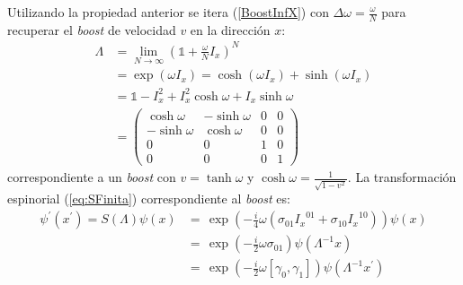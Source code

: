 \begin{example}
\begin{equation}
	\end{equation}
	Utilizando la propiedad anterior se itera (\ref{BoostInfX}) con $\Delta \omega=\frac{\omega}{N}$ para recuperar el \textit{boost} de velocidad $v$ en la dirección $x$:
	\begin{align*}
	\Lambda &= \lim_{N\rightarrow \infty}\left( \mathbb{1}+\frac{\omega}{N}I_x\right)^N\\
	&= \exp{\left(\omega I_x\right)} =\cosh{\left( \omega I_x\right)}+\sinh{\left( \omega I_x\right)}\\
	&=\mathbb{1}- I_x^2+I_x^2 \cosh{\omega}+I_x \sinh{\omega}\\	
	&=\begin{pmatrix}
    \cosh{\omega} & -\sinh{\omega} & 0 & 0 \\
    -\sinh{\omega} & \cosh{\omega} & 0 & 0 \\
    0 & 0 & 1 & 0 \\
    0 & 0 & 0 & 1
	\end{pmatrix}
	\end{align*}
	correspondiente a un \textit{boost} con $v=\tanh{\omega}$ y $\cosh{\omega}=\frac{1}{\sqrt{1-v^2}}$. La transformación espinorial (\ref{eq:SFinita}) correspondiente al \textit{boost} es:
	\begin{equation}\label{BoostEspinorial}
\begin{aligned}
\psi^{\prime}(x^{\prime})=S(\Lambda)\psi(x)&=\,\exp{\left( -\frac{i}{4}\omega\left( \sigma_{ 01}{I_{x}}^{01} +\sigma_{10}{I_{x}}^{10}\right) \right)} \psi(x)\\
&=\,\exp{\left( -\frac{i}{2}\omega\sigma_{01} \right)} \psi(\Lambda^{-1} x)\\
&=\,\exp{\left( -\frac{i}{2}\omega \left[ \gamma_0, \gamma_1 \right] \right)} \psi(\Lambda^{-1} x^\prime)
\end{aligned}
\end{equation}
\end{example}
